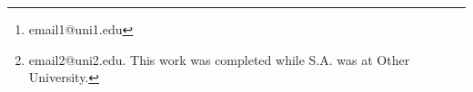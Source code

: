 \author[1]{First Author\thanks{email1@uni1.edu}}
\author[2,3]{Second Author\thanks{email2@uni2.edu. This work was completed while S.A. was at Other University.}}

